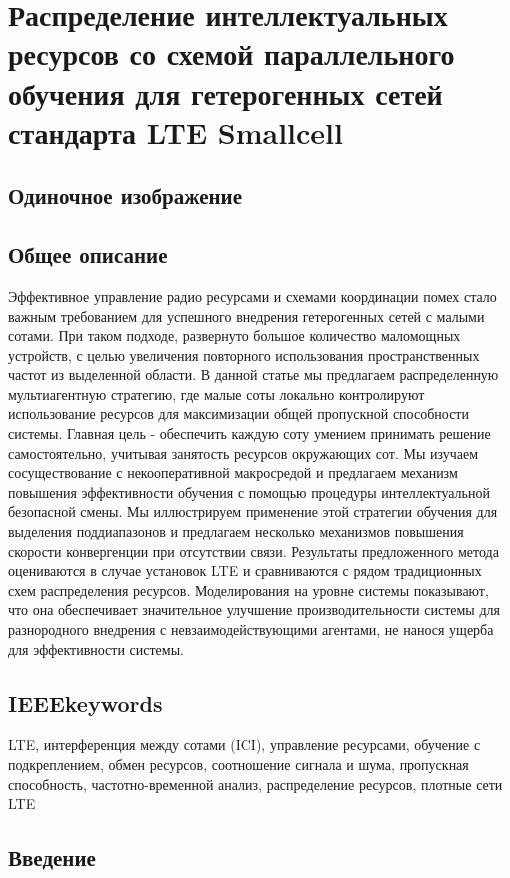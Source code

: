 \chapter{Распределение интеллектуальных ресурсов со схемой параллельного обучения для гетерогенных сетей стандарта LTE Smallcell} \label{chapt2}

\section{Одиночное изображение} \label{sect2_1}


\section{Общее описание} \label{sect2_1}
Эффективное управление радио ресурсами и схемами координации помех стало важным требованием для успешного внедрения гетерогенных сетей с малыми сотами. При таком подходе, развернуто большое количество маломощных устройств, с целью увеличения повторного использования пространственных частот из выделенной области. В данной статье мы предлагаем распределенную мультиагентную стратегию, где малые соты локально контролируют использование ресурсов для максимизации общей пропускной способности системы. Главная цель - обеспечить каждую соту умением принимать решение самостоятельно, учитывая занятость ресурсов окружающих сот. Мы изучаем сосуществование с некооперативной макросредой и предлагаем механизм повышения эффективности обучения с помощью процедуры интеллектуальной безопасной смены. Мы иллюстрируем применение этой стратегии обучения для выделения поддиапазонов и предлагаем несколько механизмов повышения скорости конвергенции при отсутствии связи. Результаты предложенного метода оцениваются в случае установок LTE и сравниваются с рядом традиционных схем распределения ресурсов. Моделирования на уровне системы показывают, что она обеспечивает значительное улучшение производительности системы для разнородного внедрения с невзаимодействующими агентами, не нанося ущерба для эффективности системы.


\section{IEEEkeywords}
LTE, интерференция между сотами (ICI), управление ресурсами, обучение с подкреплением, обмен ресурсов, соотношение сигнала и шума, пропускная способность, частотно-временной анализ, распределение ресурсов, плотные сети LTE

\section{Введение}

